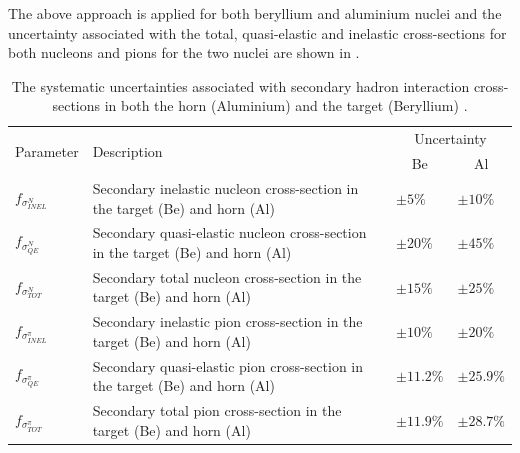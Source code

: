 The above approach is applied for both beryllium and aluminium nuclei and the uncertainty associated with the total, quasi-elastic and inelastic cross-sections for both nucleons and pions for the two nuclei are shown in .

\begin{table}[!h]
  \renewcommand{\arraystretch}{1.4}    
  \begin{tabular}{p{1.9cm} p{7.8cm} p{1.55cm} p{1.55cm}}
    \toprule
    \multirow{2}{*}{Parameter} & \multirow{2}{*}{Description} & \multicolumn{2}{c}{Uncertainty} \\
    && \multicolumn{1}{c}{Be} & \multicolumn{1}{c}{Al} \\
    \midrule

    $f_{\sigma_{INEL}^{N}}$   & Secondary inelastic nucleon cross-section in the target (Be) and horn (Al) & $\pm 5 \%$ & $\pm 10 \%$\\
                            
    $f_{\sigma_{QE}^{N}}$     & Secondary quasi-elastic nucleon cross-section in the target (Be) and horn (Al) & $\pm 20 \%$ & $\pm 45 \%$\\
                            
    $f_{\sigma_{TOT}^{N}}$    & Secondary total nucleon cross-section in the target (Be) and horn (Al) & $\pm 15 \%$ & $\pm 25 \%$\\

    $f_{\sigma_{INEL}^{\pi}}$ & Secondary inelastic pion cross-section in the target (Be) and horn (Al) & $\pm 10 \% $ & $\pm 20 \% $\\
                          
    $f_{\sigma_{QE}^{\pi}}$   & Secondary quasi-elastic pion cross-section in the target (Be) and horn (Al) & $\pm 11.2 \% $ & $\pm 25.9 \% $\\
                          
    $f_{\sigma_{TOT}^{\pi}}$  & Secondary total pion cross-section in the target (Be) and horn (Al) & $\pm 11.9 \%$ & $\pm 28.7 \%$\\
    \bottomrule
  \end{tabular}
  \caption[Hadronic secondary interaction flux systematic parameters.]{The systematic uncertainties associated with secondary hadron interaction cross-sections in both the horn (Aluminium) and the target (Beryllium) \cite{SBN_Proposal}.}
  \label{table:secondary_hadron_interaction_xsec}
\end{table}

